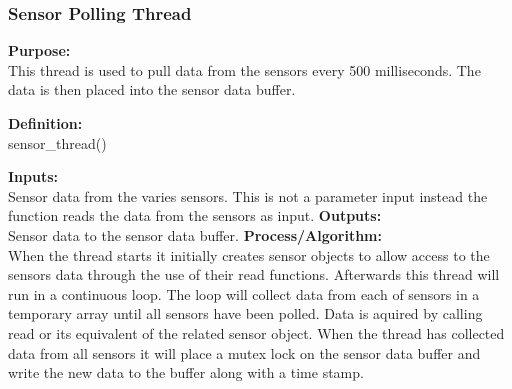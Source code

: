 \documentclass[10pt,draftclsnofoot,onecolumn,compsoc]{IEEEtran}
\begin{document}
\subsubsection{Sensor Polling Thread}
{\bf Purpose:} \\
This thread is used to pull data from the sensors every 500 milliseconds. The data is then placed into the sensor data buffer. \par
{\bf Definition:} \\ 
sensor\_thread() \par
{\bf Inputs:} \\  Sensor data from the varies sensors. This is not a parameter input instead the function reads the data from the sensors as input.
{\bf Outputs:} \\ Sensor data to the sensor data buffer.
{\bf Process/Algorithm:} \\
When the thread starts it initially creates sensor objects to allow access to the sensors data through the use of their read functions. Afterwards this thread will run in a continuous loop. The loop will collect data from each of sensors in a temporary array until all sensors have been polled. Data is aquired by calling read or its equivalent of the related sensor object. When the thread has collected data from all sensors it will place a mutex lock on the sensor data buffer and write the new data to the buffer along with a time stamp. \par
\end{document}
